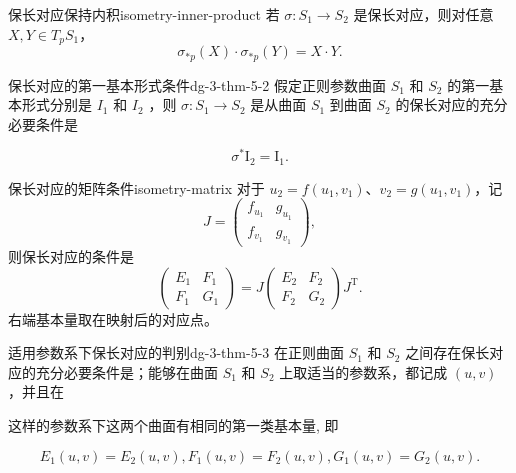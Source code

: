 \begin{proposition}{保长对应保持内积}{isometry-inner-product}
若 $\sigma:S_1\to S_2$ 是保长对应，则对任意 $X,Y\in T_pS_1$，
\[
\sigma_{*p}(X)\cdot\sigma_{*p}(Y)=X\cdot Y.
\]
\end{proposition}

\begin{theorem}{保长对应的第一基本形式条件}{dg-3-thm-5-2}
假定正则参数曲面  \(S_{1}\)  和  \(S_{2}\)  的第一基本形式分别是  \(I_{1}\)  和  \(I_{2}\) ，则  \(\sigma: S_{1} \rightarrow S_{2}\)  是从曲面  \(S_{1}\)  到曲面  \(S_{2}\)  的保长对应的充分必要条件是\par

\begin{equation*}
\sigma^ {*} \mathrm{I} _ {2} = \mathrm{I} _ {1}.
\end{equation*}
\end{theorem}

\begin{proposition}{保长对应的矩阵条件}{isometry-matrix}
对于 $u_2=f(u_1,v_1)$、$v_2=g(u_1,v_1)$，记
\[
J=\begin{pmatrix}f_{u_1}&g_{u_1}\\f_{v_1}&g_{v_1}\end{pmatrix},
\]
则保长对应的条件是
\[
\begin{pmatrix}E_1&F_1\\F_1&G_1\end{pmatrix}
=J\begin{pmatrix}E_2&F_2\\F_2&G_2\end{pmatrix}J^{\mathrm T}.
\]
右端基本量取在映射后的对应点。
\end{proposition}

\begin{theorem}{适用参数系下保长对应的判别}{dg-3-thm-5-3}
在正则曲面  \(S_{1}\)  和  \(S_{2}\)  之间存在保长对应的充分必要条件是；能够在曲面  \(S_{1}\)  和  \(S_{2}\)  上取适当的参数系，都记成  \((u,v)\) ，并且在\par

这样的参数系下这两个曲面有相同的第一类基本量, 即\par

\begin{equation*}
E _ {1} (u, v) = E _ {2} (u, v), F _ {1} (u, v) = F _ {2} (u, v), G _ {1} (u, v) = G _ {2} (u, v).
\end{equation*}
\end{theorem}

